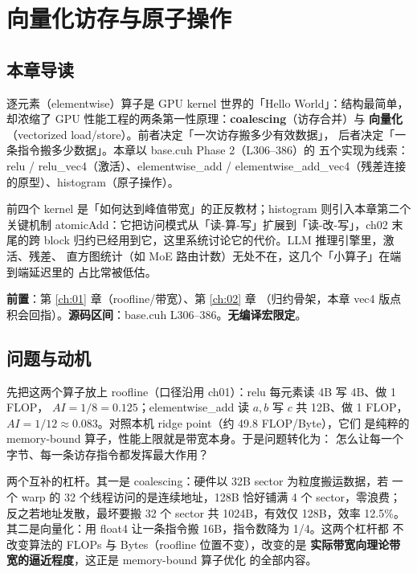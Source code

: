 \chapter{向量化访存与原子操作}\label{ch:03}

\section{本章导读}

逐元素（elementwise）算子是 GPU kernel 世界的「Hello World」：结构最简单，
却浓缩了 GPU 性能工程的两条第一性原理：\textbf{coalescing}（访存合并）与
\textbf{向量化}（vectorized load/store）。前者决定「一次访存搬多少有效数据」，
后者决定「一条指令搬多少数据」。本章以 base.cuh Phase 2（L306--386）的
五个实现为线索：relu / relu\_vec4（激活）、elementwise\_add /
elementwise\_add\_vec4（残差连接的原型）、histogram（原子操作）。

前四个 kernel 是「如何达到峰值带宽」的正反教材；histogram 则引入本章第二个
关键机制 atomicAdd：它把访问模式从「读-算-写」扩展到「读-改-写」，ch02
末尾的跨 block 归约已经用到它，这里系统讨论它的代价。LLM 推理引擎里，激活、残差、
直方图统计（如 MoE 路由计数）无处不在，这几个「小算子」在端到端延迟里的
占比常被低估。

\textbf{前置}：第 \ref{ch:01} 章（roofline/带宽）、第 \ref{ch:02} 章
（归约骨架，本章 vec4 版点积会回指）。\textbf{源码区间}：base.cuh
L306--386。\textbf{无编译宏限定}。

\section{问题与动机}

先把这两个算子放上 roofline（口径沿用 ch01）：relu 每元素读 4B 写 4B、做 1 FLOP，
$AI = 1/8 = 0.125$；elementwise\_add 读 $a,b$ 写 $c$ 共 12B、做 1 FLOP，
$AI = 1/12 \approx 0.083$。对照本机 ridge point（约 49.8 FLOP/Byte），它们
是纯粹的 memory-bound 算子，性能上限就是带宽本身。于是问题转化为：
怎么让每一个字节、每一条访存指令都发挥最大作用？

两个互补的杠杆。其一是 coalescing：硬件以 32B sector 为粒度搬运数据，若
一个 warp 的 32 个线程访问的是连续地址，128B 恰好铺满 4 个 sector，零浪费；
反之若地址发散，最坏要搬 32 个 sector 共 1024B，有效仅 128B，效率 12.5\%。
其二是向量化：用 float4 让一条指令搬 16B，指令数降为 1/4。这两个杠杆都
不改变算法的 FLOPs 与 Bytes（roofline 位置不变），改变的是
\textbf{实际带宽向理论带宽的逼近程度}，这正是 memory-bound 算子优化
的全部内容。

